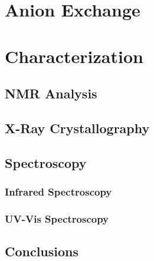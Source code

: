 \section{Anion Exchange}


\section{Characterization}

\subsection{NMR Analysis}

\subsection{X-Ray Crystallography}

\subsection{Spectroscopy}

\subsubsection{Infrared Spectroscopy}

\subsubsection{UV-Vis Spectroscopy}

\subsection{Conclusions}

